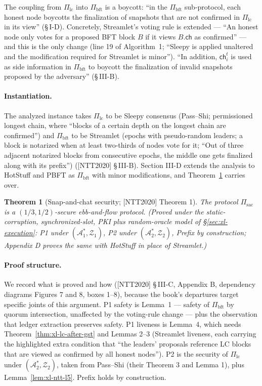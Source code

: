 \documentclass[11pt,a4paper]{article}
\newtheorem{theorem}{Theorem}[section]
\theoremstyle{definition}
\begin{document}
The coupling from $\Pi_{\mathrm{lc}}$ into $\Pi_{\mathrm{bft}}$ is a
boycott: ``in the $\Pi_{\mathrm{bft}}$ sub-protocol, each honest node
boycotts the finalization of snapshots that are not confirmed in
$\Pi_{\mathrm{lc}}$ in its view'' (\S\,I-D). Concretely, Streamlet's
voting rule is extended --- ``An honest node only votes for a proposed BFT
block $B$ if it views $B.\mathsf{ch}$ as confirmed'' --- and this is the
only change (line 19 of Algorithm~1; ``Sleepy is applied unaltered and the
modification required for Streamlet is minor''). ``In addition,
$\mathsf{ch}_i^t$ is used as side information in $\Pi_{\mathrm{bft}}$ to
boycott the finalization of invalid snapshots proposed by the adversary''
(\S\,III-B).

\paragraph{Instantiation.} The analyzed instance takes
$\Pi_{\mathrm{lc}}$ to be Sleepy consensus (Pass--Shi; permissioned
longest chain, where ``blocks of a certain depth on the longest chain are
confirmed'') and $\Pi_{\mathrm{bft}}$ to be Streamlet (epochs with
pseudo-random leaders; a block is notarized when at least two-thirds of
nodes vote for it; ``Out of three adjacent notarized blocks from
consecutive epochs, the middle one gets finalized along with its
prefix'') ([NTT2020] \S\,III-B). Section III-D extends the analysis to
HotStuff and PBFT as $\Pi_{\mathrm{bft}}$ with minor modifications, and
Theorem~\ref{thm:xl-sac-security} carries over.

\begin{theorem}[Snap-and-chat security; {[NTT2020]} Theorem 1]
\label{thm:xl-sac-security}
The protocol $\Pi_{\mathrm{sac}}$ is a $(1/3, 1/2)$-secure ebb-and-flow
protocol. (Proved under the static-corruption, synchronized-slot, PKI plus
random-oracle model of \S\ref{sec:xl-execution}: P1 under
$(\mathcal{A}_1^*, \mathcal{Z}_1)$, P2 under
$(\mathcal{A}_2^*, \mathcal{Z}_2)$, Prefix by construction; Appendix
D proves the same with HotStuff in place of Streamlet.)
\end{theorem}

\paragraph{Proof structure.} We record what is proved and how ([NTT2020]
\S\,III-C, Appendix B, dependency diagrams Figures 7 and 8, boxes 1--8),
because the book's departures target specific joints of this argument.
P1 safety is Lemma~1 --- safety of $\Pi_{\mathrm{bft}}$ by quorum
intersection, unaffected by the voting-rule change --- plus the
observation that ledger extraction preserves safety. P1 liveness is
Lemma~4, which needs Theorem~\ref{thm:xl-lc-after-gst} and Lemmas 2--3
(Streamlet liveness, each carrying the highlighted extra condition that
``the leaders' proposals reference LC blocks that are viewed as confirmed
by all honest nodes''). P2 is the security of $\Pi_{\mathrm{lc}}$ under
$(\mathcal{A}_2^*, \mathcal{Z}_2)$, taken from Pass--Shi (their Theorem 3
and Lemma 1), plus Lemma~\ref{lem:xl-ntt-l5}. Prefix holds by
construction.
\end{document}
